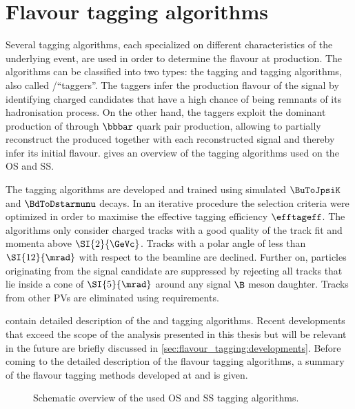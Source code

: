 \section{Flavour tagging algorithms}
\label{sec:flavour_tagging:lhcb}

Several tagging algorithms, each specialized on different characteristics of the
underlying event, are used in order to determine the \Bmeson flavour at
production. The algorithms can be classified into two types: the \SS tagging and
\OS tagging algorithms, also called \SS/\OS \enquote{taggers}. The \SS taggers
infer the production flavour of the signal \Bmeson by identifying charged
candidates that have a high chance of being remnants of its hadronisation
process. On the other hand, the \OS taggers exploit the dominant production of
\Bmesons through $\bbbar$ quark pair production, allowing to partially
reconstruct the
\bhadron produced together with each reconstructed signal \Bmeson and
thereby infer its initial flavour. 
gives an overview of the tagging algorithms used on the \acl{OS} and \acl{SS}.

The tagging algorithms are developed and trained using simulated $\BuToJpsiK$
and $\BdToDstarmunu$ decays. In an iterative procedure the selection criteria
were optimized in order to maximise the effective tagging efficiency
$\efftageff$. The algorithms only consider charged tracks with a good quality of
the track fit and momenta above $\SI{2}{\GeVc}$. Tracks with a polar angle of
less than $\SI{12}{\mrad}$ with respect to the beamline are declined. Further
on, particles originating from the signal candidate are suppressed by rejecting
all tracks that lie inside a cone of $\SI{5}{\mrad}$ around any signal $\B$
meson daughter. Tracks from other \acp{PV} are eliminated using \IP
requirements.

 contain detailed
description of the \OS and \SS tagging algorithms. Recent developments that
exceed the scope of the analysis presented in this thesis but will be relevant
in the future are briefly discussed in \cref{sec:flavour_tagging:developments}.
Before coming to the detailed description of the \LHCb flavour tagging
algorithms, a summary of the flavour tagging methods developed at \Babar and
\Belle is given.
%
\begin{figure}
\centering

\caption{Schematic overview of the used \acs*{OS} and \acs*{SS} tagging
algorithms. \cite{wishahi:2013jt}}
\label{fig:flavour_tagging:lhcb:schematics}
\end{figure}

